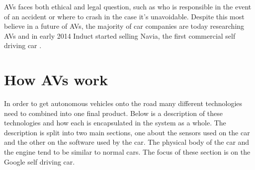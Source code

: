 \documentclass[11pt]{article}
\begin{document}
AVs faces both ethical and legal question, such as who is responsible in the event of an accident or where to crash in the case it's unavoidable. Despite this most believe in a future of AVs, the majority of car companies are today researching AVs and in early 2014 Induct started selling Navia, the first commercial self driving car \cite{Maisto2014Navia}.


\section{How AVs work}
In order to get autonomous vehicles onto the road many different technologies need to combined into one final product. Below is a description of these technologies and how each is encapsulated in the system as a whole. The description is split into two main sections, one about the sensors used on the car and the other on the software used by the car. The physical body of the car and the engine tend to be similar to normal cars. The focus of these section is on the Google self driving car. 
\end{document}
